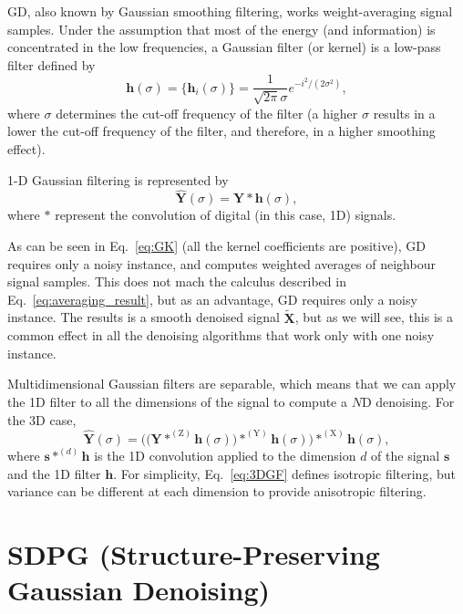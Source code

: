 \documentclass{article}
\begin{document}
GD, also known by Gaussian smoothing filtering, works weight-averaging
signal samples. Under the assumption that most of the energy (and
information) is concentrated in the low frequencies, a Gaussian filter
(or kernel) is a low-pass filter defined by
\begin{equation}
  \mathbf{h}(\sigma) = \{\mathbf{h}_i(\sigma)\} = \frac{1}{\sqrt{2\pi}\sigma}e^{{-i}^2/(2\sigma^2)},
  \label{eq:GK}
\end{equation}
where $\sigma$ determines the cut-off frequency of the filter (a higher $\sigma$
results in a lower the cut-off frequency of the filter, and therefore,
in a higher smoothing effect).

1-D Gaussian filtering is represented by
\begin{equation}
  \hat{\mathbf{Y}}(\sigma) = \mathbf{Y}*\mathbf{h}(\sigma),
  \label{eq:GF}
\end{equation}
where $*$ represent the convolution of digital (in this case, 1D) signals.

As can be seen in Eq.~\ref{eq:GK} (all the kernel coefficients are
positive), GD requires only a noisy instance, and computes weighted
averages of neighbour signal samples. This does not mach the calculus
described in Eq.~\ref{eq:averaging_result}, but as an advantage, GD
requires only a noisy instance. The results is a smooth denoised
signal $\tilde{\mathbf X}$, but as we will see, this is a common
effect in all the denoising algorithms that work only with one noisy
instance.

Multidimensional Gaussian filters are separable, which means that we
can apply the 1D filter to all the dimensions of the signal to compute
a $N$D denoising. For the 3D case,
\begin{equation}
  \hat{\mathbf{Y}}(\sigma) = \Big(\big({\mathbf Y}*^{(\text{Z})}{\mathbf h}(\sigma)\big)*^{(\text{Y})}{\mathbf h}(\sigma)\Big)*^{(\text{X})}{\mathbf h}(\sigma),
    \label{eq:3DGF}
\end{equation}
where ${\mathbf s}*^{(d)}{\mathbf h}$ is the 1D convolution applied to
the dimension $d$ of the signal ${\mathbf s}$ and the 1D filter
${\mathbf h}$. For simplicity, Eq.~\ref{eq:3DGF} defines isotropic
filtering, but variance can be different at each dimension to provide
anisotropic filtering.

\section{SDPG (Structure-Preserving Gaussian Denoising) \cite{gonzalez2023structure}}
\end{document}
